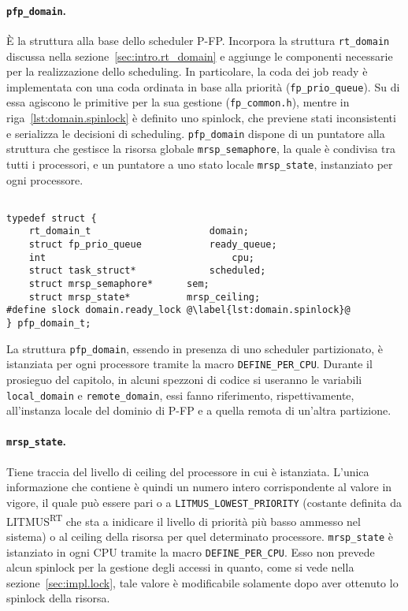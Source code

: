 \paragraph{\texttt{pfp\_domain}.} \`E la struttura alla base dello scheduler P-FP. Incorpora la struttura \texttt{rt\_domain} discussa nella sezione~\ref{sec:intro.rt_domain} e aggiunge le componenti necessarie per la realizzazione dello scheduling. In particolare, la coda dei job ready è implementata con una coda ordinata in base alla priorità (\texttt{fp\_prio\_queue}). Su di essa agiscono le primitive per la sua gestione (\texttt{fp\_common.h}), mentre in riga~\ref{lst:domain.spinlock} è definito uno spinlock, che previene stati inconsistenti e serializza le decisioni di scheduling. \texttt{pfp\_domain} dispone di un puntatore alla struttura che gestisce la risorsa globale \texttt{mrsp\_semaphore}, la quale è condivisa tra tutti i processori, e un puntatore a uno stato locale \texttt{mrsp\_state}, instanziato per ogni processore.\\

\begin{lstlisting}[label={lst:pfp_domain}] %@\label{lst:domain.spinlock}@

typedef struct {
	rt_domain_t 					domain;
	struct fp_prio_queue			ready_queue;
	int 								cpu;
	struct task_struct* 			scheduled;
	struct mrsp_semaphore* 		sem;		
	struct mrsp_state*			mrsp_ceiling;
#define slock domain.ready_lock @\label{lst:domain.spinlock}@
} pfp_domain_t;
\end{lstlisting}

La struttura \texttt{pfp\_domain}, essendo in presenza di uno scheduler partizionato, è istanziata per ogni processore tramite la macro \texttt{DEFINE\_PER\_CPU}. Durante il prosieguo del capitolo, in alcuni spezzoni di codice si useranno le variabili \texttt{local\_domain} e \texttt{remote\_domain}, essi fanno riferimento, rispettivamente, all'instanza locale del dominio di P-FP e a quella remota di un'altra partizione.

\paragraph{\texttt{mrsp\_state}.} Tiene traccia del livello di ceiling del processore in cui è istanziata. L'unica informazione che contiene è quindi un numero intero corrispondente al valore in vigore, il quale può essere pari o a \texttt{LITMUS\_LOWEST\_PRIORITY} (costante definita da LITMUS\textsuperscript{RT} che sta a inidicare il livello di priorità più basso ammesso nel sistema) o al ceiling della risorsa per quel determinato processore. \texttt{mrsp\_state} è istanziato in ogni CPU tramite la macro \texttt{DEFINE\_PER\_CPU}. Esso non prevede alcun spinlock per la gestione degli accessi in quanto, come si vede nella sezione~\ref{sec:impl.lock}, tale valore è modificabile solamente dopo aver ottenuto lo spinlock della risorsa.\\

